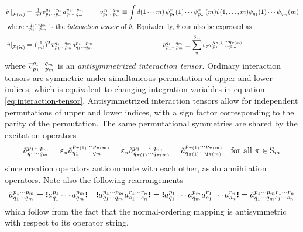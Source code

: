\documentclass[11pt]{article}
\numberwithin{equation}{section}
\begin{document}
\begin{ntt}
\begin{align}\label{eq:interaction-tensor}
  \left.
  \op{v}\,
  \right|_{\mc{F}(\mc{H})}
=&\
  \tfr{1}{m!}
  v_{p_1\cd p_m}^{q_1\cd q_m}
  a^{p_1\cd p_m}_{q_1\cd q_m}
&
  v_{p_1\cd p_m}^{q_1\cd q_m}
\equiv
  \int
  d(1\cd m)\,
  \y_{p_1}^*(1)\cd \y_{p_m}^*(m)
  \op{v}(1,\ld,m)
  \y_{q_1}(1)\cd \y_{q_m}(m)
&
\\
\intertext{
where $v_{p_1\cd p_m}^{q_1\cd q_m}$ is the \textit{interaction tensor} of $\op{v}$.
Equivalently, $\op{v}$ can also be expressed as
}
\label{eq:antisymmetrized-interaction-tensor}
  \left.
  \op{v}
  \right|_{\mc{F}(\mc{H})}
=&\
  (\tfr{1}{m!})^2\,
  \ol{v}_{p_1\cd p_m}^{q_1\cd q_m}
  a^{p_1\cd p_m}_{q_1\cd q_m}
&
  \ol{v}_{p_1\cd p_m}^{q_1\cd q_m}
\equiv
  \sum_\pi^{\mr{S}_m}
  \e_\pi
  v_{p_1\hphantom{_{\pi()}}\cd p_m}^{q_{\pi(1)}\cd q_{\pi(m)}}
\hspace{3cm}&
\end{align}
where $\overline{v}_{p_1\cdots p_m}^{q_1\cdots q_m}$ is an \textit{antisymmetrized interaction tensor}.
Ordinary interaction tensors are symmetric under simultaneous permutation of upper and lower indices, which is equivalent to changing integration variables in equation \ref{eq:interaction-tensor}.
Antisymmetrized interaction tensors allow for independent permutations of upper and lower indices, with a sign factor corresponding to the parity of the permutation.
The same permutational symmetries are shared by the excitation operators
\begin{align}\label{eq:excitation-permutational-symmetries-1}
  \tl{a}^{p_1\cd p_m}_{q_1\cd q_m}
=
  \e_{\pi}
  \tl{a}^{p_{\pi(1)}\cd p_{\pi(m)}}_{q_1\hphantom{_{\pi()}}\cd q_m}
=
  \e_{\pi}
  \tl{a}^{p_1\hphantom{_{\pi()}}\cd p_m}_{q_{\pi(1)}\cd q_{\pi(m)}}
=
  \tl{a}^{p_{\pi(1)}\cd p_{\pi(m)}}_{q_{\pi(1)}\cd q_{\pi(m)}}
&&
  \text{for all $\pi\in\mr{S}_m$}
\end{align}
since creation operators anticommute with each other, as do annihilation operators.
Note also the following rearrangements
\begin{align}\label{eq:excitation-permutational-symmetries-2}
  \tl{a}^{p_1\cd p_m}_{q_1\cd q_m}
=
  \gno{a^{p_1}_{q_1}\cd a^{p_m}_{q_m}}
&&
  \gno{a^{p_1\cd p_m}_{q_1\cd q_m}a^{r_1\cd r_n}_{s_1\cd s_n}}
=
  \gno{a^{p_1}_{q_1}\cd a^{p_m}_{q_m}a^{r_1}_{s_1}\cd a^{r_n}_{s_n}}
=
  \tl{a}^{p_1\cd p_mr_1\cd r_n}_{q_1\cd q_ms_1\cd s_n}
\end{align}
which follow from the fact that the normal-ordering mapping is antisymmetric with respect to its operator string.
\end{ntt}
\end{document}

